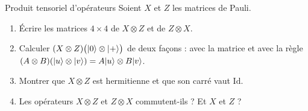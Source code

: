 \begin{exercice}{Produit tensoriel d'opérateurs}\label{ex:tensmat}
Soient $X$ et $Z$ les matrices de Pauli.
\begin{enumerate}[label=\arabic*.,nosep]
  \item Écrire les matrices $4\times4$ de $X\otimes Z$ et de $Z\otimes X$.
  \item Calculer $(X\otimes Z)\big(|0\rangle\otimes|+\rangle\big)$ de deux façons : avec la matrice et avec
        la règle $(A\otimes B)(|u\rangle\otimes|v\rangle)=A|u\rangle\otimes B|v\rangle$.
  \item Montrer que $X\otimes Z$ est hermitienne et que son carré vaut $\mathrm{Id}$.
  \item Les opérateurs $X\otimes Z$ et $Z\otimes X$ commutent-ils ? Et $X$ et $Z$ ?
\end{enumerate}
\end{exercice}

